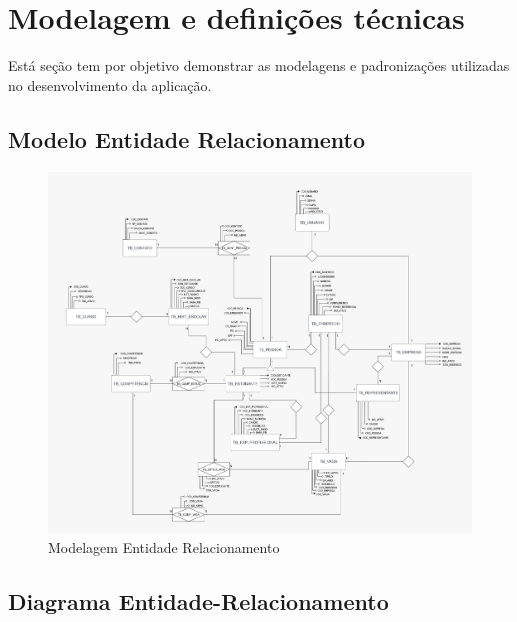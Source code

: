 \section{Modelagem e definições técnicas}
Está seção tem por objetivo demonstrar as modelagens e padronizações utilizadas no desenvolvimento da aplicação.

\subsection{Modelo Entidade Relacionamento}

\begin{figure}[H]
	\centering 
	\caption{\label{fig:mer}Modelagem Entidade Relacionamento}
	\includegraphics[width=\textwidth]{../imagens/Mer-estagiei.png} 
\end{figure}

\subsection{Diagrama Entidade-Relacionamento}

